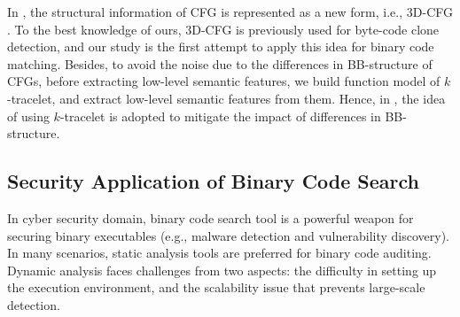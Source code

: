 In \toolNew, the structural information of CFG is represented as a new form, i.e., 3D-CFG \cite{DBLP:conf/icse/ChenLZ14}. To the best knowledge of ours, 3D-CFG is previously used for byte-code clone detection, and our study is the first attempt to apply this idea for binary code matching. Besides, to avoid the noise due to the differences in BB-structure of CFGs, before extracting low-level semantic features, we build function model of $k$-tracelet, and extract low-level semantic features from them. Hence, in \toolNew, the idea of using $k$-tracelet \cite{DBLP:conf/pldi/DavidY14} is adopted to mitigate the impact of differences in BB-structure.

\subsection{Security Application of Binary Code Search}
In cyber security domain, binary code search tool is a powerful weapon for securing binary executables (e.g., malware detection and vulnerability discovery). In many scenarios, static analysis tools are preferred for binary code auditing. Dynamic analysis
faces challenges from two aspects: the difficulty in setting up the execution environment, and the scalability issue that prevents large-scale detection.

